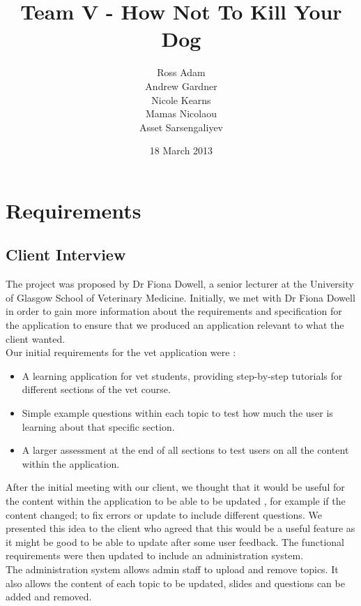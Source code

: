 \documentclass{l3proj}
\begin{document}
\title{Team V - How Not To Kill Your Dog}
\author{Ross Adam \\
        Andrew Gardner \\
        Nicole Kearns \\
        Mamas Nicolaou \\
        Asset Sarsengaliyev}
\date{18 March 2013}
\maketitle

\chapter{Requirements}
\label{req}

\section{Client Interview}

The project was proposed by Dr Fiona Dowell, a senior lecturer at the University of Glasgow School of Veterinary Medicine. Initially, we met with Dr Fiona Dowell in order to gain more information about the requirements and specification for the application to ensure that we produced an application relevant to what the client wanted.\\
Our initial requirements for the vet application were :

\begin{itemize}
\item A learning application for vet students, providing step-by-step tutorials for different sections of the vet course.
\item Simple example questions within each topic to test how much the user is learning about that specific section.
\item A larger assessment at the end of all sections to test users on all the content within the application.
\end{itemize}

After the initial meeting with our client, we thought that it would be useful for the content within the application to be able to be updated , for example if the content changed; to fix errors or update to include different questions. We presented this idea to the client who agreed that this would be a useful feature as it might be good to be able to update after some user feedback. The functional requirements were then updated to include an administration system.\\
The administration system allows admin staff to upload and remove topics. It also allows the content of each topic to be updated, slides and questions can be added and removed.
\end{document}
